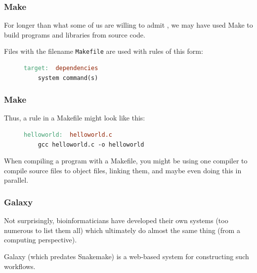 \begin{frame}[fragile]

\frametitle{Make}

For longer than what some of us are willing to admit \smiley, we may have used Make to build programs and libraries from source code.\\
\vs

Files with the filename {\texttt{Makefile}} are used with rules of this form:

\begin{figure}
  \centering
\begin{lstlisting}[language=make]
target:  dependencies
    system command(s)
\end{lstlisting}
\end{figure}

\end{frame}


\begin{frame}[fragile]

\frametitle{Make}

Thus, a rule in a Makefile might look like this:

\begin{figure}
  \centering
\begin{lstlisting}[language=make]
helloworld:  helloworld.c
	gcc helloworld.c -o helloworld
\end{lstlisting}
\end{figure}

When compiling a program with a Makefile, you might be using one compiler to compile source files to object files, linking them, and maybe even doing this in parallel.

\end{frame}


\begin{frame}

\frametitle{Galaxy}

Not surprisingly, bioinformaticians have developed their own systems (too numerous to list them all) which ultimately do almost the same thing (from a computing perspective).
\vs

Galaxy (which predates Snakemake) is a web-based system for constructing such workflows.

\end{frame}


